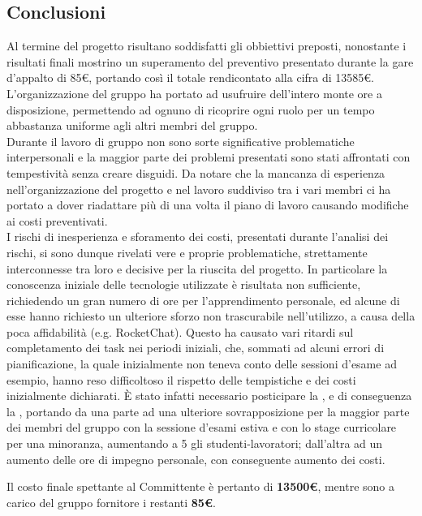 \subsection{Conclusioni}
Al termine del progetto risultano soddisfatti gli obbiettivi preposti, nonostante i risultati finali mostrino un superamento del preventivo presentato durante la gare d'appalto di 85€, portando così il totale rendicontato alla cifra di 13585€. \\
L'organizzazione del gruppo ha portato ad usufruire dell'intero monte ore a disposizione, permettendo ad ognuno di ricoprire ogni ruolo per un tempo abbastanza uniforme agli altri membri del gruppo.\\
Durante il lavoro di gruppo non sono sorte significative problematiche interpersonali e la maggior parte dei problemi presentati sono stati affrontati con tempestività senza creare disguidi. Da notare che la mancanza di esperienza nell'organizzazione del progetto e nel lavoro suddiviso tra i vari membri ci ha portato a dover riadattare più di una volta il piano di lavoro causando modifiche ai costi preventivati.\\
I rischi di inesperienza e sforamento dei costi, presentati durante l'analisi dei rischi, si sono dunque rivelati vere e proprie problematiche, strettamente interconnesse tra loro e decisive per la riuscita del progetto. In particolare la conoscenza iniziale delle tecnologie utilizzate è risultata non sufficiente, richiedendo un gran numero di ore per l'apprendimento personale, ed alcune di esse hanno richiesto un ulteriore sforzo non trascurabile nell'utilizzo, a causa della poca affidabilità (e.g. RocketChat). Questo ha causato vari ritardi sul completamento dei task nei periodi iniziali, che, sommati ad alcuni errori di pianificazione, la quale inizialmente non teneva conto delle sessioni d'esame ad esempio, hanno reso difficoltoso il rispetto delle tempistiche e dei costi inizialmente dichiarati. È stato infatti necessario posticipare la \RQ{}, e di conseguenza la \RA{}, portando da una parte ad una ulteriore sovrapposizione per la maggior parte dei membri del gruppo con la sessione d'esami estiva e con lo stage curricolare per una minoranza, aumentando a 5 gli studenti-lavoratori; dall'altra ad un aumento delle ore di impegno personale, con conseguente aumento dei costi.

Il costo finale spettante al Committente è pertanto di \textbf{13500€}, mentre sono a carico del gruppo fornitore i restanti \textbf{85€}.